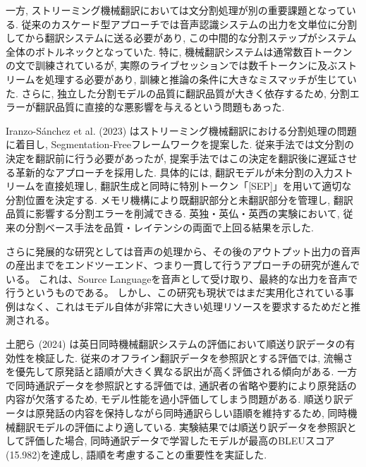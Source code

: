 一方, ストリーミング機械翻訳においては文分割処理が別の重要課題となっている.
従来のカスケード型アプローチでは音声認識システムの出力を文単位に分割してから翻訳システムに送る必要があり, この中間的な分割ステップがシステム全体のボトルネックとなっていた.
特に, 機械翻訳システムは通常数百トークンの文で訓練されているが, 実際のライブセッションでは数千トークンに及ぶストリームを処理する必要があり, 訓練と推論の条件に大きなミスマッチが生じていた.
さらに, 独立した分割モデルの品質に翻訳品質が大きく依存するため, 分割エラーが翻訳品質に直接的な悪影響を与えるという問題もあった.

Iranzo-Sánchez et al. (2023) \cite{iranzo2023segmentation}はストリーミング機械翻訳における分割処理の問題に着目し, Segmentation-Freeフレームワークを提案した.
従来手法では文分割の決定を翻訳前に行う必要があったが, 提案手法ではこの決定を翻訳後に遅延させる革新的なアプローチを採用した.
具体的には, 翻訳モデルが未分割の入力ストリームを直接処理し, 翻訳生成と同時に特別トークン「[SEP]」を用いて適切な分割位置を決定する.
メモリ機構により既翻訳部分と未翻訳部分を管理し, 翻訳品質に影響する分割エラーを削減できる.
英独・英仏・英西の実験において, 従来の分割ベース手法を品質・レイテンシの両面で上回る結果を示した.

さらに発展的な研究としては音声の処理から、その後のアウトプット出力の音声の産出までをエンドツーエンド、つまり一貫して行うアプローチの研究が進んでいる。
これは、Source Languageを音声として受け取り、最終的な出力を音声で行うというものである。
しかし、この研究も現状ではまだ実用化されている事例はなく、これはモデル自体が非常に大きい処理リソースを要求するためだと推測される。

土肥ら (2024) \cite{doi2024evaluation}は英日同時機械翻訳システムの評価において順送り訳データの有効性を検証した.
従来のオフライン翻訳データを参照訳とする評価では, 流暢さを優先して原発話と語順が大きく異なる訳出が高く評価される傾向がある.
一方で同時通訳データを参照訳とする評価では, 通訳者の省略や要約により原発話の内容が欠落するため, モデル性能を過小評価してしまう問題がある.
順送り訳データは原発話の内容を保持しながら同時通訳らしい語順を維持するため, 同時機械翻訳モデルの評価により適している.
実験結果では順送り訳データを参照訳として評価した場合, 同時通訳データで学習したモデルが最高のBLEUスコア(15.982)を達成し, 語順を考慮することの重要性を実証した.